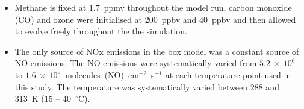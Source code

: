 \begin{itemize}
    \item Methane is fixed at $1.7$~ppmv throughout the model run, carbon monoxide (CO) and ozone were initialised at $200$~ppbv and $40$~ppbv and then allowed to evolve freely throughout the the simulation.
    \item The only source of NOx emissions in the box model was a constant source of NO emissions. The NO emissions were systematically varied from $5.2~\times~10^6$ to $1.6~\times~10^9$~molecules~(NO)~cm$^{-2}$~s$^{-1}$ at each temperature point used in this study. The temperature was systematically varied between 288 and 313~K (15 -- 40~$^{\circ}$C). 
\end{itemize}
%        

